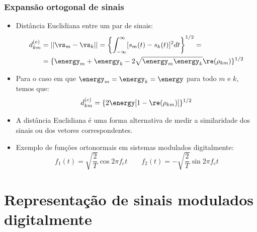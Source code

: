 \begin{frame}
	\frametitle{Expansão ortogonal de sinais}

	\begin{itemize}
	  \item Distância Euclidiana entre um par de sinais:
	   \begin{align*}
		d_{km}^{(e)} &= ||\vs_m - \vs_k || = \left\{ \int_{-\infty}^{\infty} [ s_m(t) - s_k(t) ]^2 dt \right\}^{1/2} = \\
			     &= \{ \energy_m + \energy_k - 2\sqrt{\energy_m\energy_k} \re(\rho_{km}) \}^{1/2}
	   \end{align*}
	   \item Para o caso em que $\energy_m = \energy_k = \energy$ para todo $m$ e $k$, temos que:
	    \begin{equation*}
		d_{km}^{(e)} = \{2\energy[ 1 - \re(\rho_{km}) ] \}^{1/2}
	    \end{equation*}
	    \item A distância Euclidiana é uma forma alternativa de medir a similaridade dos sinais ou dos vetores correspondentes.
	    \item Exemplo de funções ortonormais em sistemas modulados digitalmente:
	    \begin{equation*}
		f_1(t) = \sqrt{\frac{2}{T}}\cos 2\pi f_c t \qquad f_2(t) = -\sqrt{\frac{2}{T}}\sin 2\pi f_c t
	    \end{equation*}

	\end{itemize}

\end{frame}

\section{Representação de sinais modulados digitalmente}


